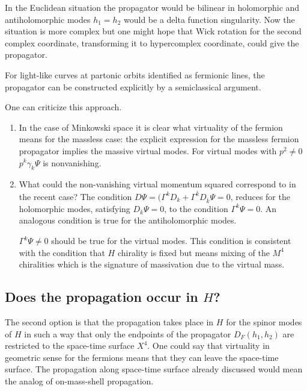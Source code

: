 \documentclass[10pt,epsf]{article}
\begin{document}
\begin{enumerate}
In the Euclidean situation the propagator would be bilinear in holomorphic and antiholomorphic  modes  $h_1=h_2$ would be a delta function singularity. Now the situation is more complex but one might hope that Wick rotation for the second complex coordinate,  transforming it to  hypercomplex coordinate,  could give the propagator.

For light-like curves at partonic orbits identified as fermionic lines, the propagator can be constructed explicitly by a semiclassical argument. 

\end{enumerate}


One can criticize this approach. 

\begin{enumerate}

\item In the case of Minkowski space it is clear what virtuality of the fermion means for the massless case: the explicit expression for  the massless  fermion propagator implies the massive virtual modes.   For virtual modes with $p^2\neq 0$   $p^k\gamma_k\Psi$ is nonvanishing.

\item What could  the  non-vanishing virtual momentum  squared correspond to in the recent case? The condition $D\Psi= (\Gamma^kD_k +\Gamma^{\overline{k}}D_{\overline{k}}\Psi=0$,  reduces for the   holomorphic modes, satisfying $D_{\overline{k}}\Psi=0$,  to the condition   $\Gamma^k\Psi=0$.  An analogous condition is true for the antiholomorphic modes.  

$\Gamma^k\Psi\neq 0$ should be true  for the virtual modes. This condition is consistent with the condition that $H$   chirality is fixed but means mixing of the $M^4$ chiralities which is the signature of massivation due to the virtual mass.

\end{enumerate}




\subsection{Does the propagation  occur in $H$?} 


The second option is that the propagation takes place in  $H$  for the spinor modes of $H$  in such a way that only  the endpoints of the propagator $D_F(h_1,h_2)$ are restricted to the space-time surface $X^4$. One could say that virtuality in geometric sense for the fermions means that they can leave the space-time surface. The propagation along space-time surface already discussed would mean the analog of on-mass-shell propagation. 
\end{document}
